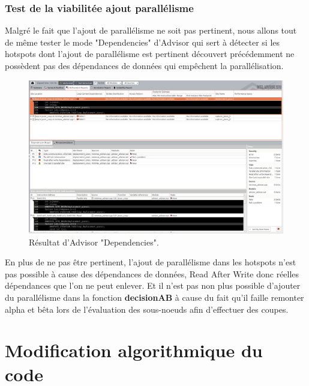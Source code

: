 \documentclass[
 aip,
 jmp,
 amsmath,amssymb,
 reprint
]{revtex4-1}
\begin{document}
\subsubsection{Test de la viabilitée ajout parallélisme}

Malgré le fait que l'ajout de parallélisme ne soit pas pertinent, nous allons tout de même tester le mode "Dependencies" d'Advisor qui sert à détecter si les hotspots dont l'ajout de parallélisme est pertinent découvert précédemment ne possèdent pas des dépendances de données qui empêchent la parallélisation.

\begin{figure}[H]
  \includegraphics[width=\linewidth, keepaspectratio=true]{dependecies.png}
  \caption{Résultat d'Advisor "Dependencies".\label{Fig:advisor_dependencies}}
\end{figure}

En plus de ne pas être pertinent, l'ajout de parallélisme dans les hotspots n'est pas possible à cause des dépendances de données, Read After Write donc réelles dépendances que l'on ne peut enlever. Et il n'est pas non plus possible d'ajouter du parallélisme dans la fonction \textbf{decisionAB} à cause du fait qu'il faille remonter alpha et bêta\pageref{Fig:alpha_beta} lors de l'évaluation des sous-noeuds afin d'effectuer des coupes.

\section{Modification algorithmique du code}
\end{document}
